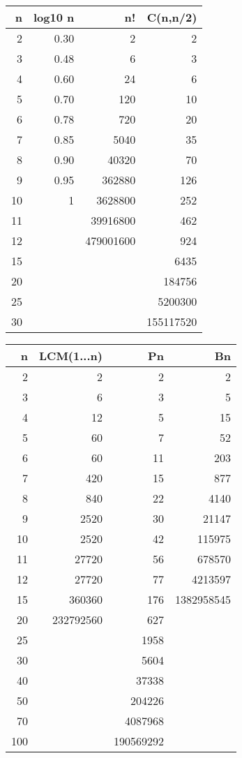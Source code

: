 \begin{small}
\begin{table}[H]
	\centering
	\begin{tabular}{|r|r|r|r|}
		\hline
		n & log10 n & n! & C(n,n/2) \\
		\hline
		2 & 0.30 & 2 & 2 \\
		\hline
		3 & 0.48 & 6 & 3 \\
		\hline
		4 & 0.60 & 24 & 6 \\
		\hline
		5 & 0.70 & 120 & 10 \\
		\hline
		6 & 0.78 & 720 & 20 \\
		\hline
		7 & 0.85 & 5040 & 35 \\
		\hline
		8 & 0.90 & 40320 & 70 \\
		\hline
		9 & 0.95 & 362880 & 126 \\
		\hline
		10 & 1 & 3628800 & 252 \\
		\hline
		11 &  & 39916800 & 462 \\
		\hline
		12 &  & 479001600 & 924 \\
		\hline
		15 &  &  & 6435 \\
		\hline
		20 &  &  & 184756 \\
		\hline
		25 &  &  & 5200300 \\
		\hline
		30 &  &  & 155117520 \\
		\hline
		\end{tabular}
		\begin{tabular}{|r|r|r|r|}
			\hline
			n  & LCM(1...n)  & Pn  & Bn \\
			\hline
			2  & 2  & 2  & 2 \\
			\hline
			3  & 6  & 3  & 5 \\
			\hline
			4  & 12  & 5  & 15 \\
			\hline
			5  & 60  & 7  & 52 \\
			\hline
			6  & 60  & 11  & 203 \\
			\hline
			7  & 420  & 15  & 877 \\
			\hline
			8  & 840  & 22  & 4140 \\
			\hline
			9  & 2520  & 30  & 21147 \\
			\hline
			10  & 2520  & 42  & 115975 \\
			\hline
			11  & 27720  & 56  & 678570 \\
			\hline
			12  & 27720  & 77  & 4213597 \\
			\hline
			15  & 360360  & 176  & 1382958545 \\
			\hline
			20  & 232792560  & 627  &  \\
			\hline
			25  &   & 1958  &  \\
			\hline
			30  &   & 5604  &  \\
			\hline
			40  &   & 37338  &  \\
			\hline
			50  &   & 204226  &  \\
			\hline
			70  &   & 4087968  &  \\
			\hline
			100  &   & 190569292  &  \\
			\hline
		\end{tabular}
	\end{table}
\end{small}
